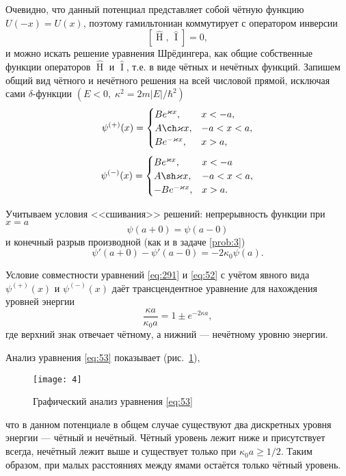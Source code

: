 \documentclass[a4paper]{article}
\begin{document}
\begin{sol}
Очевидно, что данный потенциал представляет собой чётную функцию
$U(-x)=U(x)$, поэтому гамильтониан коммутирует с оператором
инверсии
\[
[ \widehat{\operatorname{H}},\,\hat{\operatorname{I}} ] =0
 ,\] 
и можно искать решение уравнения Шрёдингера, как общие собственные
 функции операторов $\widehat{\operatorname{H}}$ и $\hat{\operatorname{I}}$,
т.\:е. в виде чётных и нечётных функций. Запишем общий вид
чётного и нечётного решения на всей числовой прямой, исключая
сами $\delta$-функции $(E<0,\; \kappa^2 = 2 m |E| /\hbar^2)$ 
\[
	\psi^{(+)}(x) =
	\begin{cases}
		B e^{\kappa x}, & x<-a,\\
		A \ch \kappa x, & -a <x<a,\\
		B e^{-\kappa x},& x>a,
	\end{cases}
\]
\[
	\psi^{(-)}(x)=
	\begin{cases}
		B e^{\kappa x},& x<-a\\
		A \sh \kappa x, & -a<x<a,\\
		-B e^{-\kappa x},& x>a.
	\end{cases}
\]

Учитываем условия <<сшивания>> решений: непрерывность функции
при $x=a$ 
\begin{equation}
	\psi(a+0)=\psi(a-0)
	\label{eq:291}
\end{equation} 
и конечный разрыв производной (как и в задаче \ref{prob:3})
\begin{equation}
	\psi'(a+0)-\psi'(a-0)=-2\kappa_0 \psi (a)
	\label{eq:52}
.\end{equation} 

Условие совместности уравнений \eqref{eq:291} и \eqref{eq:52}
с учётом явного вида $\psi^{(+)}(x)$ и $\psi^{(-)}(x)$ даёт
трансцендентное уравнение для нахождения уровней энергии
\begin{equation}
\frac{\kappa a}{\kappa_0 a}=1 \pm e^{-2\kappa a}
\label{eq:53}
 ,\end{equation}
где верхний знак отвечает чётному, а нижний --- нечётному
уровню энергии.

Анализ уравнения \eqref{eq:53} показывает (рис.~\ref{fig:4}),
\begin{figure}[htpb]
	\centering
	\texttt{[image: 4]}
	\caption{Графический анализ уравнения \eqref{eq:53}}
	\label{fig:4}
\end{figure}
что в данном потенциале в общем  случае существуют два
дискретных уровня энергии --- чётный и нечётный. Чётный уровень
лежит ниже и присутствует всегда, нечётный лежит выше и
существует только при $\kappa_0 a \ge  1 /2$. Таким образом,
при малых расстояниях между ямами остаётся только чётный уровень.


\end{sol}
\end{document}
